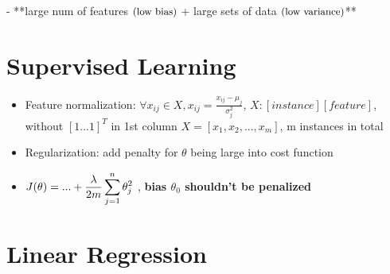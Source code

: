 - **large num of features $\small\text{(low bias)}$ + large sets of data $\small\text{(low variance)}$**


\section{Supervised Learning}
\begin{itemize}

\item Feature normalization: $\forall x_{ij} \in X, x_{ij}=\frac{x_{ij}-\mu_j}{\sigma_j^2}$, $ X:[instance][feature]$, without $[1...1]^T$ in 1st column $X=[x_1,x_2,...,x_m]$, m instances in total
\item Regularization: add penalty for $\theta$ being large into cost function
\item $\displaystyle J(\theta)= \space... + \frac{\lambda}{2m}\sum^n_{j=1}\theta_j^2$ , \textbf{bias $\theta_0$ shouldn't be penalized} 

\end{itemize}

\section{Linear Regression}

